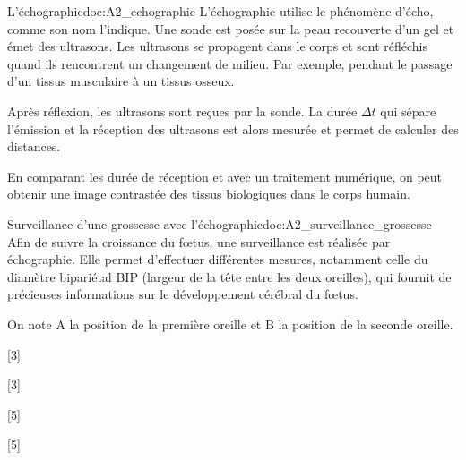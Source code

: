 \begin{doc}{L'échographie}{doc:A2_echographie}
  L'échographie utilise le phénomène d'écho, comme son nom l'indique.
  Une sonde est posée sur la peau recouverte d'un gel et émet des ultrasons.
  Les ultrasons se propagent dans le corps et sont réfléchis quand ils rencontrent un changement de milieu.
  Par exemple, pendant le passage d'un tissus musculaire à un tissus osseux.

  Après réflexion, les ultrasons sont reçues par la sonde.
  La durée $\Delta t$ qui sépare l'émission et la réception des ultrasons est alors mesurée et permet de calculer des distances.

  En comparant les durée de réception et avec un traitement numérique, on peut obtenir une image contrastée des tissus biologiques dans le corps humain.

\end{doc}

\begin{doc}{Surveillance d'une grossesse avec l'échographie}{doc:A2_surveillance_grossesse}
  Afin de suivre la croissance du fœtus, une surveillance est réalisée par échographie.
  Elle permet d’effectuer différentes mesures, notamment celle du diamètre bipariétal BIP
  (largeur de la tête entre les deux oreilles),
  qui fournit de précieuses informations sur le développement cérébral du fœtus.
  
  On note A la position de la première oreille et B la position de la seconde oreille.
\end{doc}


[3]

[3]

[5]

[5]
